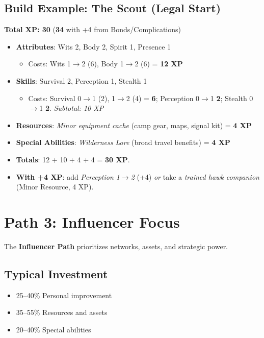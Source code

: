 \subsection*{Build Example: The Scout (Legal Start)}
\textbf{Total XP: 30} \quad (\textbf{34} with +4 from Bonds/Complications)
\begin{itemize}
\item \textbf{Attributes}: Wits 2, Body 2, Spirit 1, Presence 1
  \begin{itemize}
  \item Costs: Wits 1$\to$2 (6), Body 1$\to$2 (6) = \textbf{12 XP}
  \end{itemize}
\item \textbf{Skills}: Survival 2, Perception 1, Stealth 1
  \begin{itemize}
  \item Costs: Survival 0$\to$1 (2), 1$\to$2 (4) = \textbf{6}; Perception 0$\to$1 \textbf{2}; Stealth 0$\to$1 \textbf{2}. \emph{Subtotal: 10 XP}
  \end{itemize}
\item \textbf{Resources}: \emph{Minor equipment cache} (camp gear, maps, signal kit) = \textbf{4 XP}
\item \textbf{Special Abilities}: \emph{Wilderness Lore} (broad travel benefits) = \textbf{4 XP}
\item \textbf{Totals}: 12 + 10 + 4 + 4 = \textbf{30 XP}.
\item \textbf{With +4 XP}: add \emph{Perception 1$\to$2} (+4) \emph{or} take a \emph{trained hawk companion} (Minor Resource, 4 XP).
\end{itemize}

\section{Path 3: Influencer Focus}

The \textbf{Influencer Path} prioritizes networks, assets, and strategic power.

\subsection*{Typical Investment}
\begin{itemize}
\item 25--40\% Personal improvement
\item 35--55\% Resources and assets
\item 20--40\% Special abilities
\end{itemize}

